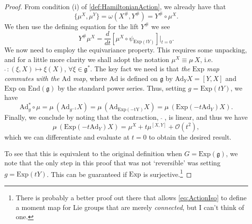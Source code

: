 \documentclass[11pt, final]{article}
\begin{document}
\begin{proof}
	From condition (i) of \ref{def:HamiltonianAction}, we already have that 
		\begin{equation}\label{key}
			\{ \mu^X, \mu^Y \} = \omega \left( X^\#, Y^\# \right) = Y^\# \circ \mu^X.
		\end{equation}
	We then use the defining equation for the lift $ Y^\# $ we see
		\begin{equation}\label{key}
			Y^\# \mu^X = \frac{d}{dt} \left[ \mu^X \circ \psi_{\mathrm{Exp}(tY)} \right] |_{t=0}.
		\end{equation}
	We now need to employ the equivariance property. This requires some unpacking, and for a little more clarity we shall adopt the notation $ \mu^X \equiv \mu \widehat{\ } X $, i.e. $ \, \widehat{\ } : (\xi, X) \mapsto \xi(X) $, $ \forall \xi \in \mathfrak{g}^* $. The key fact we need is that \textit{the $ \mathrm{Exp} $ map commutes with the $ \mathrm{Ad} $ map}, where $ \mathrm{Ad} $ is defined on $ \mathfrak{g} $ by $ \mathrm{Ad}_Y X = [Y,X] $ and $ \mathrm{Exp} $ on $ \mathrm{End}(\mathfrak{g}) $ by the standard power series. Thus, setting $ g = \mathrm{Exp} (tY) $, we have
		\begin{equation}\label{key}
			\mathrm{Ad}^*_g \circ \mu = \mu \widehat{\ } (\mathrm{Ad}_{g^{-1}} X) =
			\mu \widehat{\ }(\mathrm{Ad}_{\mathrm{Exp (-tY)}} X) = \mu \widehat{\ }\left( \mathrm{Exp} ( -t \mathrm{Ad}_Y) X  \right).
		\end{equation}
	Finally, we conclude by noting that the contraction, $ \, \widehat{\ } \, $, is linear, and thus we have
		\begin{equation}\label{key}
			\mu \widehat{\ } \left( \mathrm{Exp} ( -t \mathrm{Ad}_Y) X  \right) = \mu^X + t \mu^{[X,Y]} + \mathcal{O}(t^2),
		\end{equation}
	which we can differentiate and evaluate at $ t=0 $ to obtain the desired result.
	
	To see that this is equivalent to the original definition when $ G = \mathrm{Exp}(\mathfrak{g}) $, we note that the only step in this proof that was not `reversible' was setting $ g = \mathrm{Exp}(tY) $. This can be guaranteed if $ \mathrm{Exp} $ is surjective.\footnote{There is probably a better proof out there that allows \eqref{eq:ActionIso} to define a moment map for Lie groups that are merely \textit{connected}, but I can't think of one. }
\end{proof}
\end{document}
